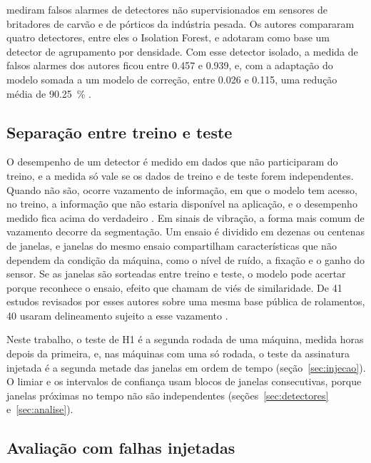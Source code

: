  mediram falsos alarmes de detectores não supervisionados em sensores de britadores de carvão e de pórticos da indústria pesada. Os autores compararam quatro detectores, entre eles o Isolation Forest, e adotaram como base um detector de agrupamento por densidade. Com esse detector isolado, a medida de falsos alarmes dos autores ficou entre \num{0,457} e \num{0,939}, e, com a adaptação do modelo somada a um modelo de correção, entre \num{0,026} e \num{0,115}, uma redução média de \SI{90,25}{\percent} \cite{hermansa2022}.

\subsection{Separação entre treino e teste}\label{sec:fund-validacao}

O desempenho de um detector é medido em dados que não participaram do treino, e a medida só vale se os dados de treino e de teste forem independentes. Quando não são, ocorre vazamento de informação, em que o modelo tem acesso, no treino, a informação que não estaria disponível na aplicação, e o desempenho medido fica acima do verdadeiro \cite{kaufman2012}. Em sinais de vibração, a forma mais comum de vazamento decorre da segmentação. Um ensaio é dividido em dezenas ou centenas de janelas, e janelas do mesmo ensaio compartilham características que não dependem da condição da máquina, como o nível de ruído, a fixação e o ganho do sensor. Se as janelas são sorteadas entre treino e teste, o modelo pode acertar porque reconhece o ensaio, efeito que  chamam de viés de similaridade. De \num{41} estudos revisados por esses autores sobre uma mesma base pública de rolamentos, \num{40} usaram delineamento sujeito a esse vazamento \cite{varejao2025}.

Neste trabalho, o teste de H1 é a segunda rodada de uma máquina, medida horas depois da primeira, e, nas máquinas com uma só rodada, o teste da assinatura injetada é a segunda metade das janelas em ordem de tempo (seção~\ref{sec:injecao}). O limiar e os intervalos de confiança usam blocos de janelas consecutivas, porque janelas próximas no tempo não são independentes (seções~\ref{sec:detectores} e~\ref{sec:analise}).

\subsection{Avaliação com falhas injetadas}\label{sec:fund-injecao}

